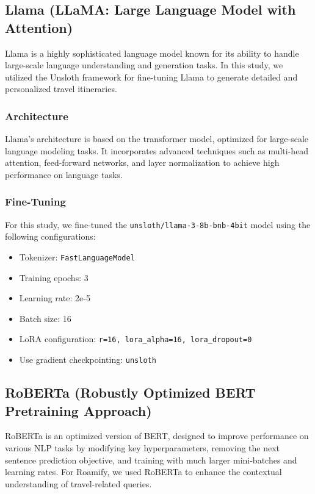 \documentclass[conference]{IEEEtran}
\begin{document}
\subsection{Llama (LLaMA: Large Language Model with Attention)}

Llama is a highly sophisticated language model known for its ability to handle large-scale language understanding and generation tasks. In this study, we utilized the Unsloth framework for fine-tuning Llama to generate detailed and personalized travel itineraries.

\subsubsection{Architecture}
Llama's architecture is based on the transformer model, optimized for large-scale language modeling tasks. It incorporates advanced techniques such as multi-head attention, feed-forward networks, and layer normalization to achieve high performance on language tasks.

\subsubsection{Fine-Tuning}
For this study, we fine-tuned the \texttt{unsloth/llama-3-8b-bnb-4bit} model using the following configurations:
\begin{itemize}
    \item Tokenizer: \texttt{FastLanguageModel}
    \item Training epochs: 3
    \item Learning rate: 2e-5
    \item Batch size: 16
    \item LoRA configuration: \texttt{r=16, lora\_alpha=16, lora\_dropout=0}
    \item Use gradient checkpointing: \texttt{unsloth}
\end{itemize}

\subsection{RoBERTa (Robustly Optimized BERT Pretraining Approach)}

RoBERTa is an optimized version of BERT, designed to improve performance on various NLP tasks by modifying key hyperparameters, removing the next sentence prediction objective, and training with much larger mini-batches and learning rates. For Roamify, we used RoBERTa to enhance the contextual understanding of travel-related queries.
\end{document}
